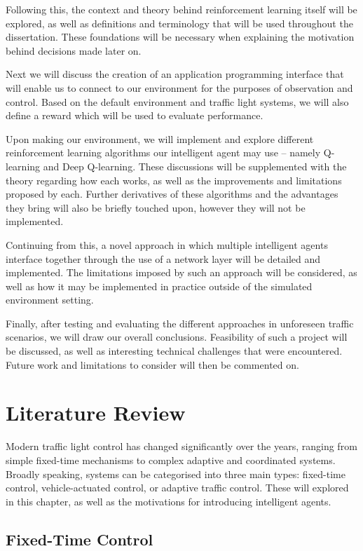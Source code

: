 \documentclass[a4paper]{report}
\begin{document}
Following this, the context and theory behind reinforcement learning itself will be explored, as well as definitions and terminology that will be used throughout the dissertation. These foundations will be necessary when explaining the motivation behind decisions made later on.

Next we will discuss the creation of an application programming interface that will enable us to connect to our environment for the purposes of observation and control. Based on the default environment and traffic light systems, we will also define a reward which will be used to evaluate performance.

Upon making our environment, we will implement and explore different reinforcement learning algorithms our intelligent agent may use -- namely Q-learning and Deep Q-learning. These discussions will be supplemented with the theory regarding how each works, as well as the improvements and limitations proposed by each. Further derivatives of these algorithms and the advantages they bring will also be briefly touched upon, however they will not be implemented.

Continuing from this, a novel approach in which multiple intelligent agents interface together through the use of a network layer will be detailed and implemented. The limitations imposed by such an approach will be considered, as well as how it may be implemented in practice outside of the simulated environment setting.

Finally, after testing and evaluating the different approaches in unforeseen traffic scenarios, we will draw our overall conclusions. Feasibility of such a project will be discussed, as well as interesting technical challenges that were encountered. Future work and limitations to consider will then be commented on.

\chapter{Literature Review}

Modern traffic light control has changed significantly over the years, ranging from simple fixed-time mechanisms to complex adaptive and coordinated systems. Broadly speaking, systems can be categorised into three main types: fixed-time control, vehicle-actuated control, or adaptive traffic control. These will explored in this chapter, as well as the motivations for introducing intelligent agents.

\section{Fixed-Time Control}
\end{document}
